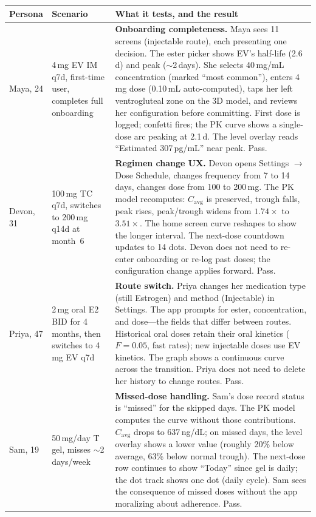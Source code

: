 \documentclass[11pt,a4paper]{article}
\newcommand{\good}[1]{#1}
\begin{document}
\begin{longtable}{@{}p{2.6cm}p{4.5cm}p{7.4cm}@{}}
\toprule
\textbf{Persona} & \textbf{Scenario} & \textbf{What it tests, and the result} \\
\midrule
\endhead
Maya, 24 & 4\,mg EV IM q7d, first-time user, completes full onboarding
 & \textbf{Onboarding completeness.} Maya sees 11 screens (injectable
   route), each presenting one decision. The ester picker shows EV's
   half-life (2.6\,d) and peak ($\sim$2\,days). She selects
   40\,mg/mL concentration (marked ``most common''), enters 4\,mg dose
   (0.10\,mL auto-computed), taps her left ventrogluteal zone on the 3D
   model, and reviews her configuration before committing. First dose is
   logged; confetti fires; the PK curve shows a single-dose arc peaking at
   2.1\,d. The level overlay reads ``Estimated 307\,pg/mL'' near peak.
   \good{Pass.} \\[0.4em]

Devon, 31 & 100\,mg TC q7d, switches to 200\,mg q14d at month~6
 & \textbf{Regimen change UX.} Devon opens Settings $\to$ Dose Schedule,
   changes frequency from 7 to 14 days, changes dose from 100 to
   200\,mg. The PK model recomputes: $C_{\mathrm{avg}}$ is preserved,
   trough falls, peak rises, peak/trough widens from $1.74\times$ to
   $3.51\times$. The home screen curve reshapes to show the longer
   interval. The next-dose countdown updates to 14 dots. Devon does not
   need to re-enter onboarding or re-log past doses; the configuration
   change applies forward. \good{Pass.} \\[0.4em]

Priya, 47 & 2\,mg oral E2 BID for 4 months, then switches to 4\,mg EV q7d
 & \textbf{Route switch.} Priya changes her medication type (still
   Estrogen) and method (Injectable) in Settings. The app prompts for
   ester, concentration, and dose---the fields that differ between routes.
   Historical oral doses retain their oral kinetics ($F = 0.05$, fast
   rates); new injectable doses use EV kinetics. The graph shows a
   continuous curve across the transition. Priya does not need to delete
   her history to change routes. \good{Pass.} \\[0.4em]

Sam, 19 & 50\,mg/day T gel, misses $\sim$2 days/week
 & \textbf{Missed-dose handling.} Sam's dose record status is ``missed''
   for the skipped days. The PK model computes the curve without those
   contributions. $C_{\mathrm{avg}}$ drops to 637\,ng/dL; on missed days,
   the level overlay shows a lower value (roughly 20\% below average,
   63\% below normal trough). The next-dose row continues to show
   ``Today'' since gel is daily; the dot track shows one dot (daily
   cycle). Sam sees the consequence of missed doses without the app
   moralizing about adherence. \good{Pass.} \\[0.4em]


\end{longtable}
\end{document}
